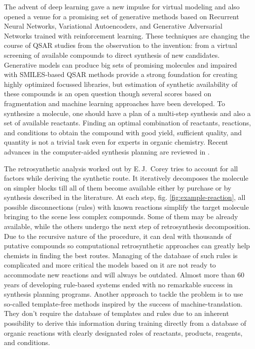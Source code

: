 \documentclass{article}
\begin{document}
The advent of deep learning\cite{ChenDrugDiscovery} gave a new impulse for virtual modeling and also opened a venue for a promising set of generative methods based on Recurrent Neural Networks\cite{ErtlLSTM}, Variational Autoencoders\cite{DuvenaudVAE}, and Generative Adversarial Networks trained with reinforcement learning\cite{ORGAN,OlivecronaReinforcment}. These techniques are changing the course of QSAR studies from the observation to the invention: from a virtual screening of available compounds to direct synthesis of new candidates. Generative models can produce big sets of promising molecules and impaired with SMILES-based QSAR methods\cite{TetkoCNF} provide a strong foundation for creating highly optimized focussed libraries, but estimation of synthetic availability of these compounds is an open question though several scores based on fragmentation\cite{ErtlSaScore} and machine learning\cite{ColeySCScore} approaches have been developed. 
To synthesize a molecule, one should have a plan of a multi-step synthesis and also a set of available reactants. 
Finding an optimal combination of reactants, reactions, and conditions to obtain the compound with good yield, sufficient quality, and quantity is not a trivial task even for experts in organic chemistry. Recent advances in the computer-aided synthesis planning are reviewed in \cite{ColeyReview,EnkvinstReview,BaskinReview}. 

The retrosynthetic analysis worked out by E.\,J.~Corey \cite{Corey} tries to account for all factors while deriving the synthetic route. It iteratively decomposes the molecule on simpler blocks till all of them become available either by purchase or by synthesis described in the literature. At each step, fig. \ref{fig:example-reaction}, all possible disconnections (rules) with known reactions simplify the target molecule bringing to the scene less complex compounds. Some of them may be already available, while the others undergo the next step of retrosynthesis decomposition. Due to the recursive nature of the procedure, it can deal with thousands of putative compounds so computational retrosynthetic approaches can greatly help chemists in finding the best routes. Managing of the database of such rules is complicated and more critical the models based on it are not ready to accommodate new reactions and will always be outdated. Almost more than 60 years of developing rule-based systems ended with no remarkable success in synthesis planning programs. Another approach to tackle the problem is to use so-called template-free methods inspired by the success of machine-translation. They don't require the database of templates and rules due to an inherent possibility to derive this information during training directly from a database of organic reactions with clearly designated roles of reactants, products, reagents, and conditions.
\end{document}
